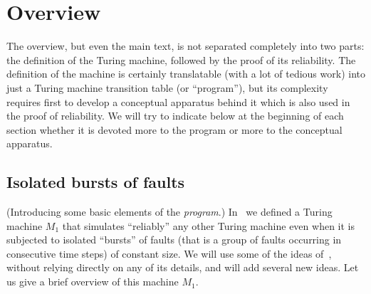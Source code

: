 \documentclass[11pt]{memoir}
\theoremstyle{definition} %
\begin{document}
\section{Overview}

The overview, but even the main text, is not separated completely
into two parts: the definition of the Turing machine, followed by the proof of its reliability.
The definition of the machine is certainly translatable (with a lot of tedious work) into just a Turing
machine transition table (or ``program''), but its complexity requires first to develop a conceptual
apparatus behind it which is also used in the proof of reliability.
We will try to indicate below at the beginning of each
section whether it is devoted more to the program or more to the conceptual apparatus.

\subsection{Isolated bursts of faults}\label{sec:bursts}

(Introducing some basic elements of the \emph{program}.)
In~\cite{burstyTuring13} we defined a Turing machine \( M_{1} \) that simulates ``reliably'' any other
Turing machine even when it is subjected to isolated ``bursts'' of faults (that is a group
of faults occurring in consecutive time steps) of constant size.
We will use some of the ideas of~\cite{burstyTuring13}, without relying directly
on any of its details, and will add several new ideas.
Let us give a brief overview of this machine \( M_{1} \).
\end{document}
